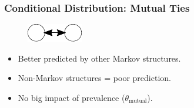\documentclass[aspectratio=169, 9pt]{beamer}
\begin{document}
\begin{frame}[c,label=conditional-mutual]
	\frametitle{Conditional Distribution: Mutual Ties}
	\begin{minipage}[b]{.23\linewidth}
		\begin{figure}
			\includegraphics[width=.3\linewidth]{mutual.pdf}
		\end{figure}
		\small
		\begin{itemize}[<+->]
			\item Better predicted by other Markov structures.
			\item Non-Markov structures = poor prediction.
			\item No big impact of prevalence ($\theta_{\mbox{mutual}}$).
		\end{itemize}
	\end{minipage}
	\begin{minipage}[b]{.75\linewidth}
		\begin{figure}
			\centering
			\def\svgwidth{.95\linewidth}
		\end{figure}
	\end{minipage}
	\vfill\hfill
	\hyperlink{conditional-transitivity}{}
\end{frame}
\end{document}
